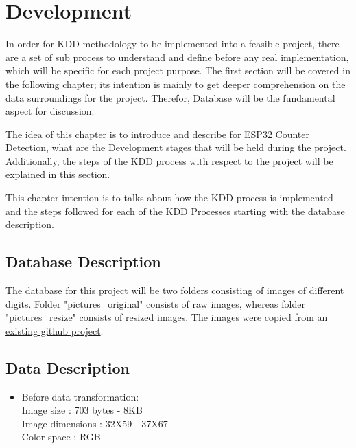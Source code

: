 %
%
%
%



\chapter{Development}

In order for KDD methodology to be implemented into a feasible project, there are a set of sub process to understand and define before any real implementation, which will be specific for each project purpose. The first section will be covered in the following chapter; its intention is mainly to get deeper comprehension on the data surroundings for the project. Therefor, Database will be the fundamental aspect for discussion.

The idea of this chapter is to introduce and describe for ESP32 Counter Detection, what are the Development stages that will be held during the project. Additionally, the steps of the KDD process with respect to the project will be explained in this section. \cite{Mueller:2020,Mueller:2021}

This chapter intention is to talks about how the KDD process is implemented and the steps followed
for each of the KDD Processes starting with the database description.

\section{Database Description}

The database for this project will be two folders consisting of images of different digits. Folder "pictures\_original" consists of raw images, whereas folder "pictures\_resize" consists of resized images. The images were copied from an \href{https://github.com/jomjol/ctmake-KI-ESP32-Teil2}{existing github project}. 

\section{Data Description }
\begin{itemize}
	\item Before data transformation:\\
	Image size : 703 bytes - 8KB\\
	Image dimensions : 32X59 - 37X67\\
	Color space : RGB
\end{itemize}

